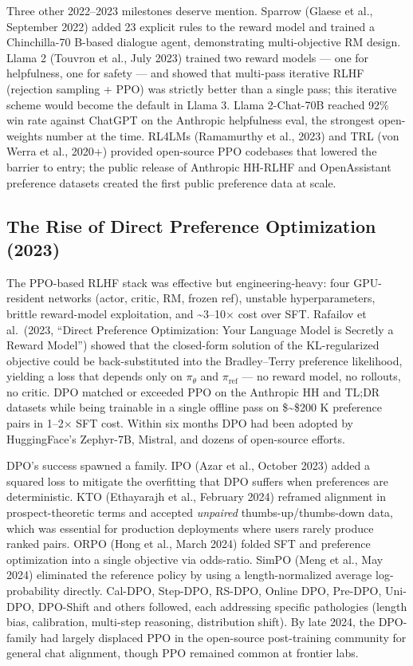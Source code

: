 Three other 2022--2023 milestones deserve mention. Sparrow (Glaese et al., September 2022) added 23 explicit rules to the reward model and trained a Chinchilla-70 B-based dialogue agent, demonstrating multi-objective RM design. Llama 2 (Touvron et al., July 2023) trained two reward models --- one for helpfulness, one for safety --- and showed that multi-pass iterative RLHF (rejection sampling + PPO) was strictly better than a single pass; this iterative scheme would become the default in Llama 3. Llama 2-Chat-70B reached 92\% win rate against ChatGPT on the Anthropic helpfulness eval, the strongest open-weights number at the time. RL4LMs (Ramamurthy et al., 2023) and TRL (von Werra et al., 2020+) provided open-source PPO codebases that lowered the barrier to entry; the public release of Anthropic HH-RLHF and OpenAssistant preference datasets created the first public preference data at scale.

\subsection{The Rise of Direct Preference Optimization (2023)}\label{the-rise-of-direct-preference-optimization-2023}

The PPO-based RLHF stack was effective but engineering-heavy: four GPU-resident networks (actor, critic, RM, frozen ref), unstable hyperparameters, brittle reward-model exploitation, and \textasciitilde3--10× cost over SFT. Rafailov et al.~(2023, ``Direct Preference Optimization: Your Language Model is Secretly a Reward Model'') showed that the closed-form solution of the KL-regularized objective could be back-substituted into the Bradley--Terry preference likelihood, yielding a loss that depends only on \(\pi_\theta\) and \(\pi_{\text{ref}}\) --- no reward model, no rollouts, no critic. DPO matched or exceeded PPO on the Anthropic HH and TL;DR datasets while being trainable in a single offline pass on \$\sim\$200 K preference pairs in 1--2× SFT cost. Within six months DPO had been adopted by HuggingFace's Zephyr-7B, Mistral, and dozens of open-source efforts.

DPO's success spawned a family. IPO (Azar et al., October 2023) added a squared loss to mitigate the overfitting that DPO suffers when preferences are deterministic. KTO (Ethayarajh et al., February 2024) reframed alignment in prospect-theoretic terms and accepted \emph{unpaired} thumbs-up/thumbs-down data, which was essential for production deployments where users rarely produce ranked pairs. ORPO (Hong et al., March 2024) folded SFT and preference optimization into a single objective via odds-ratio. SimPO (Meng et al., May 2024) eliminated the reference policy by using a length-normalized average log-probability directly. Cal-DPO, Step-DPO, RS-DPO, Online DPO, Pre-DPO, Uni-DPO, DPO-Shift and others followed, each addressing specific pathologies (length bias, calibration, multi-step reasoning, distribution shift). By late 2024, the DPO-family had largely displaced PPO in the open-source post-training community for general chat alignment, though PPO remained common at frontier labs.

